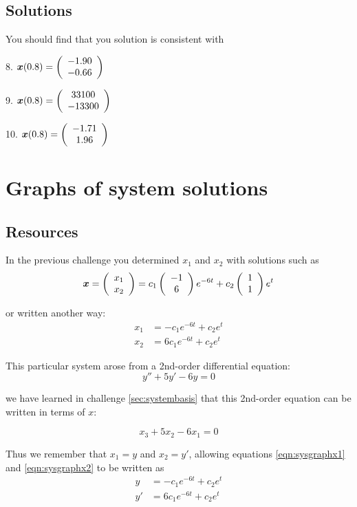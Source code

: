 \subsection*{Solutions}
You should find that you solution is consistent with

8. $\displaystyle \bm{x}(0.8) = \left(\begin{array}{c}{-1.90}\\{-0.66}\end{array}\right)$

9. $\displaystyle \bm{x}(0.8) = \left(\begin{array}{c}{33100}\\{-13300}\end{array}\right)$

10. $\displaystyle \bm{x}(0.8) = \left(\begin{array}{c}{-1.71}\\{1.96}\end{array}\right)$




\iffalse
\newpage
\section{Graphs of system solutions}

\subsection*{Resources}
In the previous challenge you determined $x_1$ and $x_2$ with solutions such as
\begin{equation}
    \bm{x} = \left(\begin{array}{c}{x_1}\\{x_2}\end{array}\right) = c_1 \left(\begin{array}{c}{-1}\\{6}\end{array}\right) e^{-6t} + c_2 \left(\begin{array}{c}{1}\\{1}\end{array}\right) e^t
\end{equation}

or written another way:
\begin{align}
    x_1 &= -c_1 e^{-6t} + c_2 e^t \label{eqn:sysgraphx1} \\
    x_2 &= 6 c_1 e^{-6t} + c_2 e^t \label{eqn:sysgraphx2} 
\end{align}

This particular system arose from a 2nd-order differential equation:
\begin{equation}
    y'' + 5y' - 6y = 0 \label{eqn:sys2ndoode}
\end{equation}

we have learned in challenge \ref{sec:systembasis} that this 2nd-order equation can be written in terms of $x$:

\begin{equation}
    x_3 + 5x_2 - 6 x_1 = 0
\end{equation}

Thus we remember that $x_1 = y$ and $x_2 = y'$, allowing equations \ref{eqn:sysgraphx1} and \ref{eqn:sysgraphx2} to be written as
\begin{align}
    y &= -c_1 e^{-6t} + c_2 e^t \label{eqn:syspos} \\
    y' &= 6 c_1 e^{-6t} + c_2 e^t \label{eqn:sysvel} 
\end{align}

